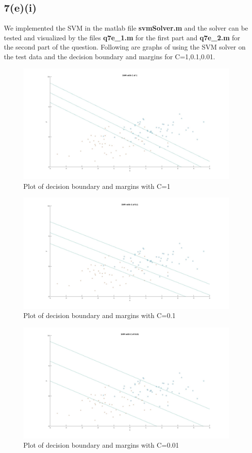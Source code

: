 \documentclass{article}
\begin{document}
\subsection*{7(e)(i)}
We implemented the SVM in the matlab file \textbf{svmSolver.m} and the solver can be tested and visualized by the files \textbf{q7e\_1.m} for the first part and \textbf{q7e\_2.m} for the second part of the question.
Following are graphs of using the SVM solver on the test data and the decision boundary and margins for C=1,0.1,0.01.
\begin{figure}[H]
\centering
\includegraphics[width=6.5in]{figures/q7-5-3.jpg}
\caption{Plot of decision boundary and margins with C=1}
\end{figure}
\begin{figure}[H]
\centering
\includegraphics[width=6.5in]{figures/q7-5-2.jpg}
\caption{Plot of decision boundary and margins with C=0.1}
\end{figure}
\begin{figure}[H]
\centering
\includegraphics[width=6.5in]{figures/q7-5-1.jpg}
\caption{Plot of decision boundary and margins with C=0.01}
\end{figure}
\end{document}

